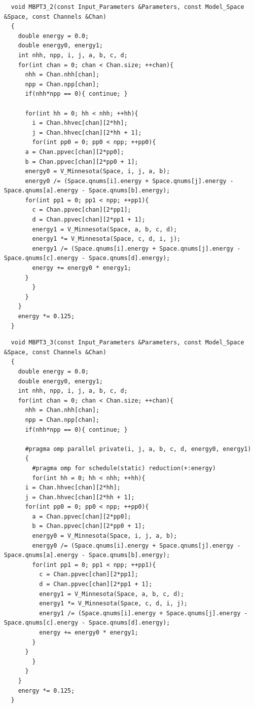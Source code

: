 \begin{lstlisting}
  void MBPT3_2(const Input_Parameters &Parameters, const Model_Space &Space, const Channels &Chan)
  {
    double energy = 0.0;
    double energy0, energy1;
    int nhh, npp, i, j, a, b, c, d;
    for(int chan = 0; chan < Chan.size; ++chan){
      nhh = Chan.nhh[chan];
      npp = Chan.npp[chan];
      if(nhh*npp == 0){ continue; }
      
      for(int hh = 0; hh < nhh; ++hh){
        i = Chan.hhvec[chan][2*hh];
        j = Chan.hhvec[chan][2*hh + 1];
        for(int pp0 = 0; pp0 < npp; ++pp0){
	  a = Chan.ppvec[chan][2*pp0];
	  b = Chan.ppvec[chan][2*pp0 + 1];
	  energy0 = V_Minnesota(Space, i, j, a, b);
	  energy0 /= (Space.qnums[i].energy + Space.qnums[j].energy - Space.qnums[a].energy - Space.qnums[b].energy);
	  for(int pp1 = 0; pp1 < npp; ++pp1){
	    c = Chan.ppvec[chan][2*pp1];
	    d = Chan.ppvec[chan][2*pp1 + 1];
	    energy1 = V_Minnesota(Space, a, b, c, d);
	    energy1 *= V_Minnesota(Space, c, d, i, j);
	    energy1 /= (Space.qnums[i].energy + Space.qnums[j].energy - Space.qnums[c].energy - Space.qnums[d].energy);
	    energy += energy0 * energy1;
	  }
        }
      }
    }
    energy *= 0.125;
  }
\end{lstlisting}

\begin{lstlisting}
  void MBPT3_3(const Input_Parameters &Parameters, const Model_Space &Space, const Channels &Chan)
  {
    double energy = 0.0;
    double energy0, energy1;
    int nhh, npp, i, j, a, b, c, d;
    for(int chan = 0; chan < Chan.size; ++chan){
      nhh = Chan.nhh[chan];
      npp = Chan.npp[chan];
      if(nhh*npp == 0){ continue; }
      
      #pragma omp parallel private(i, j, a, b, c, d, energy0, energy1)
      {
        #pragma omp for schedule(static) reduction(+:energy)
        for(int hh = 0; hh < nhh; ++hh){
	  i = Chan.hhvec[chan][2*hh];
	  j = Chan.hhvec[chan][2*hh + 1];
	  for(int pp0 = 0; pp0 < npp; ++pp0){
	    a = Chan.ppvec[chan][2*pp0];
	    b = Chan.ppvec[chan][2*pp0 + 1];
	    energy0 = V_Minnesota(Space, i, j, a, b);
	    energy0 /= (Space.qnums[i].energy + Space.qnums[j].energy - Space.qnums[a].energy - Space.qnums[b].energy);
	    for(int pp1 = 0; pp1 < npp; ++pp1){
	      c = Chan.ppvec[chan][2*pp1];
	      d = Chan.ppvec[chan][2*pp1 + 1];
	      energy1 = V_Minnesota(Space, a, b, c, d);
	      energy1 *= V_Minnesota(Space, c, d, i, j);
	      energy1 /= (Space.qnums[i].energy + Space.qnums[j].energy - Space.qnums[c].energy - Space.qnums[d].energy);
	      energy += energy0 * energy1;
	    }
	  }
        }
      }
    }
    energy *= 0.125;
  }
\end{lstlisting}

